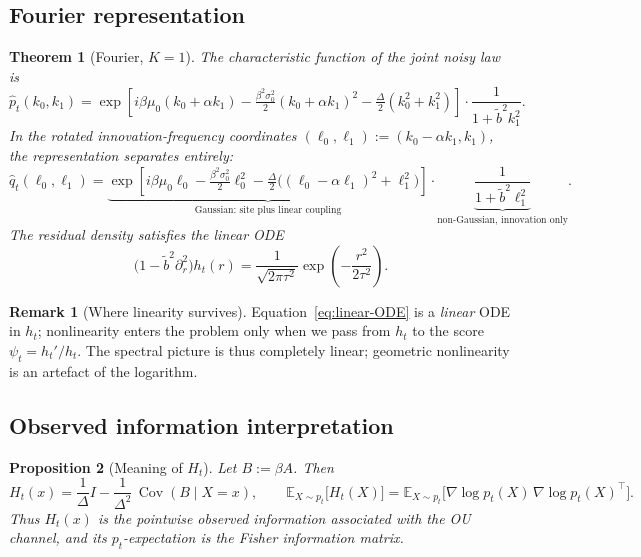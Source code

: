 \documentclass[11pt,a4paper]{article}
\theoremstyle{plainserif}
\newtheorem{theorem}{Theorem}
\newtheorem{proposition}[theorem]{Proposition}
\theoremstyle{definition}
\theoremstyle{remarkstyle}
\newtheorem*{remark}{Remark}
\newcommand{\E}{\mathbb{E}}
\newcommand{\Cov}{\operatorname{Cov}}
\newcommand{\btilde}{\tilde{b}}
\newcommand{\hatfn}[1]{\widehat{#1}}
\begin{document}
\subsection{Fourier representation}

\begin{theorem}[Fourier, $K{=}1$]
\label{thm:fourier}
The characteristic function of the joint noisy law is
\begin{equation}
\hatfn{p}_t(k_0,k_1) =
\exp\!\left[i\beta\mu_0(k_0+\alpha k_1) - \tfrac{\beta^2\sigma_0^2}{2}(k_0+\alpha k_1)^2
      - \tfrac{\Delta}{2}(k_0^2+k_1^2)\right]
\cdot \frac{1}{1 + \btilde^2 k_1^2}.
\label{eq:fourier-K1}
\end{equation}
In the rotated innovation-frequency coordinates $(\ell_0,\ell_1) := (k_0 - \alpha k_1, k_1)$,
the representation separates entirely:
\begin{equation}
\hatfn{q}_t(\ell_0, \ell_1) =
\underbrace{\exp\!\left[i\beta\mu_0 \ell_0 - \tfrac{\beta^2\sigma_0^2}{2}\ell_0^2
      - \tfrac{\Delta}{2}\bigl((\ell_0-\alpha\ell_1)^2 + \ell_1^2\bigr)\right]}_{\text{Gaussian: site plus linear coupling}}
 \cdot
\underbrace{\frac{1}{1+\btilde^2\ell_1^2}}_{\text{non-Gaussian, innovation only}}.
\end{equation}
The residual density satisfies the linear ODE
\begin{equation}
\bigl(1 - \btilde^2\partial_r^2\bigr) h_t(r) = \frac{1}{\sqrt{2\pi\tau^2}}
\exp\!\left(-\frac{r^2}{2\tau^2}\right).
\label{eq:linear-ODE}
\end{equation}
\end{theorem}

\begin{remark}[Where linearity survives]
Equation~\eqref{eq:linear-ODE} is a \emph{linear} ODE in $h_t$; nonlinearity
enters the problem only when we pass from $h_t$ to the score
$\psi_t = h_t'/h_t$. The spectral picture is thus completely
linear; geometric nonlinearity is an artefact of the logarithm.
\end{remark}

\subsection{Observed information interpretation}

\begin{proposition}[Meaning of $H_t$]
\label{prop:obs-info}
Let $B := \beta A$. Then
\begin{equation}
H_t(x) = \frac{1}{\Delta} I - \frac{1}{\Delta^2}\,\Cov(B \mid X = x),
\qquad
\E_{X\sim p_t}\bigl[H_t(X)\bigr] = \E_{X\sim p_t}\bigl[\nabla\log p_t(X)\,\nabla\log p_t(X)^\top\bigr].
\label{eq:obs-info}
\end{equation}
Thus $H_t(x)$ is the pointwise observed information associated with
the OU channel, and its $p_t$-expectation is the Fisher information matrix.
\end{proposition}
\end{document}
